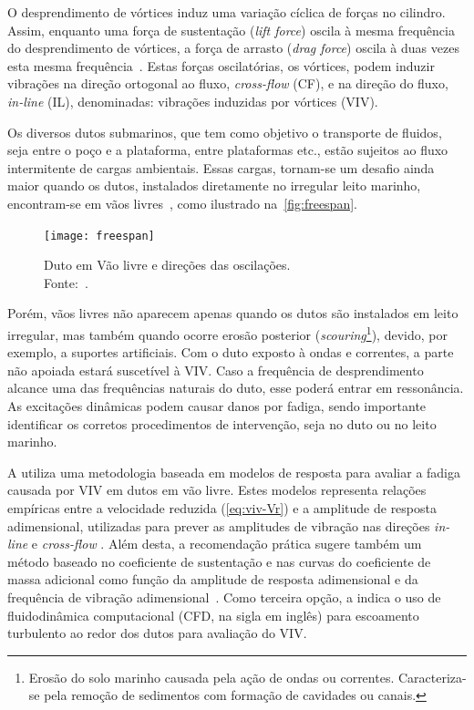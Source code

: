 O desprendimento de vórtices induz uma variação cíclica de forças no cilindro.
Assim, enquanto uma força de sustentação (\textit{lift force}) oscila à mesma frequência do desprendimento de vórtices, a força de arrasto (\textit{drag force}) oscila à duas vezes esta mesma frequência~\cite{Sumer1995}.
Estas forças oscilatórias, os vórtices, podem induzir vibrações na direção ortogonal ao fluxo, \textit{cross-flow} (CF), e na direção do fluxo, \textit{in-line} (IL), denominadas: vibrações induzidas por vórtices (VIV).

Os diversos dutos submarinos, que tem como objetivo o transporte de fluidos, seja entre o poço e a plataforma, entre plataformas etc., estão sujeitos ao fluxo intermitente de cargas ambientais.
Essas cargas, tornam-se um desafio ainda maior quando os dutos, instalados diretamente no irregular leito marinho, encontram-se em vãos livres~\cite{Fyrileiv1998}, como ilustrado na~\autoref{fig:freespan}.

\begin{figure}[!h]
	\centering
	\texttt{[image: freespan]}
	\caption[Duto em Vão livre e direções das oscilações]{Duto em Vão livre e direções das oscilações.\\Fonte:~\cite{DNV2017}.}\label{fig:freespan}
\end{figure}

Porém, vãos livres não aparecem apenas quando os dutos são instalados em leito irregular, mas também quando ocorre erosão posterior (\textit{scouring}\footnote{Erosão do solo marinho causada pela ação de ondas ou correntes. Caracteriza-se pela remoção de sedimentos com formação de cavidades ou canais.}), devido, por exemplo, a suportes artificiais.
Com o duto exposto à ondas e correntes, a parte não apoiada estará suscetível à VIV.
Caso a frequência de desprendimento alcance uma das frequências naturais do duto, esse poderá entrar em ressonância.
As excitações dinâmicas podem causar danos por fadiga, sendo importante identificar os corretos procedimentos de intervenção, seja no duto ou no leito marinho.

A  utiliza uma metodologia baseada em modelos de resposta para avaliar a fadiga causada por VIV em dutos em vão livre.
Estes modelos representa relações empíricas entre a velocidade reduzida (\autoref{eq:viv-Vr}) e a amplitude de resposta adimensional, utilizadas para prever as amplitudes de vibração nas direções \textit{in-line} e \textit{cross-flow} \cite{Mork2003,DNV2017}.
Além desta, a recomendação prática sugere também um método baseado no coeficiente de sustentação e nas curvas do coeficiente de massa adicional como função da amplitude de resposta adimensional e da frequência de vibração adimensional~\cite{DNV2017}.
Como terceira opção, a  indica o uso de fluidodinâmica computacional (CFD, na sigla em inglês) para escoamento turbulento ao redor dos dutos para avaliação do VIV.

